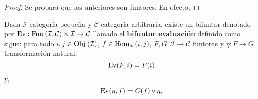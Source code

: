 \documentclass[12pt]{report}
\theoremstyle{largebreak}
\newcommand\cf[3]{\ensuremath{#1:#2\rightarrow#3}}
\newcommand{\Obj}[1]{\ensuremath{\textup{Obj}\left(#1\right)}}
\newcommand{\Hom}[3]{\ensuremath{\textup{Hom}_{#1}\left(#2,#3\right)}}
\newcommand{\Fun}[2]{\ensuremath{\textup{Fun}\left(#1,#2\right)}}
\newcommand{\Ev}{\ensuremath{\textup{Ev}}}
\begin{document}
    \begin{proof}
        Se probará que los anteriores son funtores. En efecto,
    \end{proof}

    \begin{mydef}
        Dada $\mathcal{I}$ categoría pequeña y $\mathcal{C}$ categoría arbitraria, existe un bifuntor denotado por $\cf{\Ev}{\Fun{\mathcal{I}}{\mathcal{C}}\times\mathcal{I}}{\mathcal{C}}$ llamado el \textbf{bifuntor evaluación} definido como sigue: para todo $i,j\in\Obj{\mathcal{I}}$, $f\in\Hom{\mathcal{I}}{i}{j}$, $\cf{F,G}{\mathcal{I}}{\mathcal{C}}$ funtores y $\cf{\eta}{F}{G}$ transformación natural,
        \begin{equation*}
            \Ev(F,i)=F(i)
        \end{equation*}
        y,
        \begin{equation*}
            \Ev(\eta,f)=G(f)\circ\eta_i
        \end{equation*}
    \end{mydef}
\end{document}
